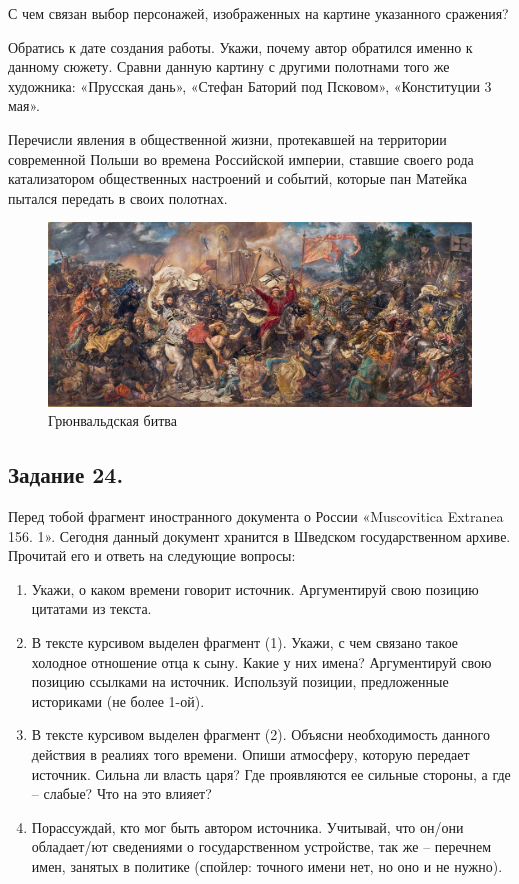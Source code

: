 \begin{list}{)}{\leftmargin=6mm  \topsep=0mm  \itemsep=0pt \parsep=0mm \itemindent=-1pt}
\item С чем связан выбор персонажей, изображенных на картине указанного сражения?
\item Обратись к дате создания работы. Укажи, почему автор обратился именно к данному сюжету. Сравни данную картину с другими полотнами того же художника: «Прусская дань», «Стефан Баторий под Псковом», «Конституции 3 мая».
\item Перечисли явления в общественной жизни, протекавшей на территории современной Польши во времена Российской империи, ставшие своего рода катализатором общественных настроений и событий, которые пан Матейка пытался передать в своих полотнах.
\end{list}   

\begin{figure}
\includegraphics[width=1\textwidth]{images/history-2.jpg}\caption{\label{matejko}Грюнвальдская битва}
\end{figure}

\subsection*{Задание 24.}
    Перед тобой фрагмент иностранного документа о России «Muscovitica Extranea 156. 1». Сегодня данный документ хранится в Шведском государственном архиве. Прочитай его и ответь на следующие вопросы:
    
    \begin{enumerate}
    \item Укажи, о каком времени говорит источник. Аргументируй свою позицию цитатами из текста.
    \item В тексте курсивом выделен фрагмент (1). Укажи, с чем связано такое холодное отношение отца к сыну. Какие у них имена? Аргументируй свою позицию ссылками на источник. Используй позиции, предложенные историками (не более 1-ой).
    \item В тексте курсивом выделен фрагмент (2). Объясни необходимость данного действия в реалиях того времени. Опиши атмосферу, которую передает источник. Сильна ли власть царя? Где проявляются ее сильные стороны, а где – слабые? Что на это влияет? 
    \item Порассуждай, кто мог быть автором источника. Учитывай, что он/они обладает/ют сведениями о государственном устройстве, так же – перечнем имен, занятых в политике (спойлер: точного имени нет, но оно и не нужно).
    \end{enumerate}   
    
